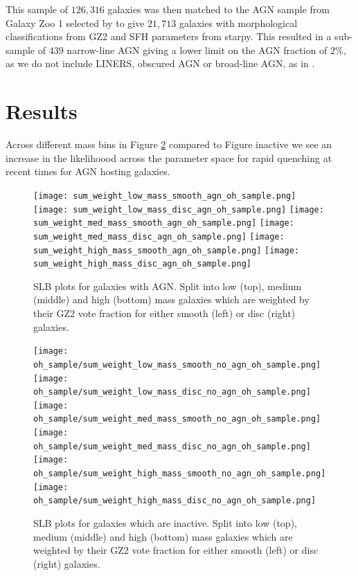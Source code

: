 \documentclass[useAMS,usenatbib]{mn2e}
\begin{document}
This sample of $126, 316$ galaxies was then matched to the AGN sample from Galaxy Zoo 1 selected by \cite{Sch2010} to give $21,713$ galaxies with morphological classifications from GZ2 and SFH parameters from starpy. This resulted in a sub-sample of $439$ narrow-line AGN giving a lower limit on the AGN fraction of $2\%$, as we do not include LINERS, obscured AGN or broad-line AGN, as in \cite{Sch2010}.






\section{Results}

Across different mass bins in Figure \ref{agn} compared to Figure {inactive} we see an increase in the likelihoood across the parameter space for rapid quenching at recent times for AGN hosting galaxies. 

\begin{figure}
\texttt{[image: sum\_weight\_low\_mass\_smooth\_agn\_oh\_sample.png]}
\texttt{[image: sum\_weight\_low\_mass\_disc\_agn\_oh\_sample.png]}
\texttt{[image: sum\_weight\_med\_mass\_smooth\_agn\_oh\_sample.png]}
\texttt{[image: sum\_weight\_med\_mass\_disc\_agn\_oh\_sample.png]}
\texttt{[image: sum\_weight\_high\_mass\_smooth\_agn\_oh\_sample.png]}
\texttt{[image: sum\_weight\_high\_mass\_disc\_agn\_oh\_sample.png]}
\caption{SLB plots for galaxies with AGN. Split into low (top), medium (middle) and high (bottom) mass galaxies which are weighted by their GZ2 vote fraction for either smooth (left) or disc (right) galaxies.}
\label{agn}
\end{figure}

\begin{figure}
\texttt{[image: oh\_sample/sum\_weight\_low\_mass\_smooth\_no\_agn\_oh\_sample.png]}
\texttt{[image: oh\_sample/sum\_weight\_low\_mass\_disc\_no\_agn\_oh\_sample.png]}
\texttt{[image: oh\_sample/sum\_weight\_med\_mass\_smooth\_no\_agn\_oh\_sample.png]}
\texttt{[image: oh\_sample/sum\_weight\_med\_mass\_disc\_no\_agn\_oh\_sample.png]}
\texttt{[image: oh\_sample/sum\_weight\_high\_mass\_smooth\_no\_agn\_oh\_sample.png]}
\texttt{[image: oh\_sample/sum\_weight\_high\_mass\_disc\_no\_agn\_oh\_sample.png]}
\caption{SLB plots for galaxies which are inactive. Split into low (top), medium (middle) and high (bottom) mass galaxies which are weighted by their GZ2 vote fraction for either smooth (left) or disc (right) galaxies.}
\label{agn}
\end{figure}
\end{document}
